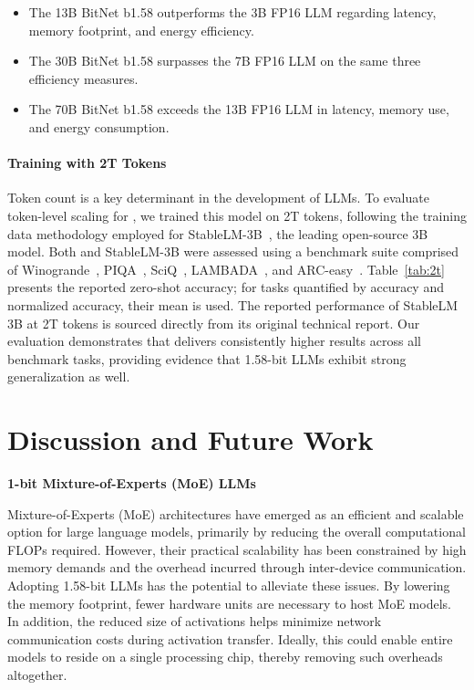 \begin{itemize}
    \item The 13B BitNet b1.58 outperforms the 3B FP16 LLM regarding latency, memory footprint, and energy efficiency.
    \item The 30B BitNet b1.58 surpasses the 7B FP16 LLM on the same three efficiency measures.
    \item The 70B BitNet b1.58 exceeds the 13B FP16 LLM in latency, memory use, and energy consumption.
\end{itemize}

\paragraph{Training with 2T Tokens}

Token count is a key determinant in the development of LLMs. To evaluate token-level scaling for , we trained this model on 2T tokens, following the training data methodology employed for StableLM-3B~\cite{StableLM-3B-4E1T}, the leading open-source 3B model. Both  and StableLM-3B were assessed using a benchmark suite comprised of Winogrande~\cite{winoGrande}, PIQA~\cite{piqa}, SciQ~\cite{sciq}, LAMBADA~\cite{lambada}, and ARC-easy~\cite{arc}. Table~\ref{tab:2t} presents the reported zero-shot accuracy; for tasks quantified by accuracy and normalized accuracy, their mean is used. The reported performance of StableLM 3B at 2T tokens is sourced directly from its original technical report. Our evaluation demonstrates that  delivers consistently higher results across all benchmark tasks, providing evidence that 1.58-bit LLMs exhibit strong generalization as well.

\section{Discussion and Future Work}

\textbf{1-bit Mixture-of-Experts (MoE) LLMs}

Mixture-of-Experts (MoE) architectures have emerged as an efficient and scalable option for large language models, primarily by reducing the overall computational FLOPs required. However, their practical scalability has been constrained by high memory demands and the overhead incurred through inter-device communication. Adopting 1.58-bit LLMs has the potential to alleviate these issues. By lowering the memory footprint, fewer hardware units are necessary to host MoE models. In addition, the reduced size of activations helps minimize network communication costs during activation transfer. Ideally, this could enable entire models to reside on a single processing chip, thereby removing such overheads altogether.

